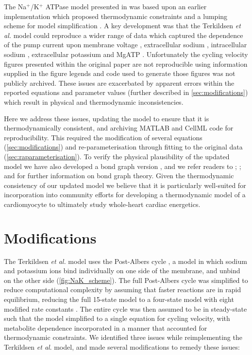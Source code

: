 \documentclass[fleqn,10pt]{physiome}
\begin{document}
The Na$^+$/K$^+$ ATPase model presented in \citet{terkildsen_balance_2007} was based upon an earlier implementation which proposed thermodynamic constraints and a lumping scheme for model simplification \citep{smith_development_2004}. A key development was that the Terkildsen \textit{et al.} model could reproduce a wider range of data which captured the dependence of the pump current upon membrane voltage \citep{nakao_[na]_1989}, extracellular sodium \citep{nakao_[na]_1989}, intracellular sodium \citep{hansen_dependence_2002}, extracellular potassium \citep{nakao_[na]_1989} and MgATP \citep{friedrich_na+k+-atpase_1996}. Unfortunately the cycling velocity figures presented within the original paper are not reproducible using information supplied in the figure legends \citep[Fig. 2]{terkildsen_balance_2007} and code used to generate those figures was not publicly archived. These issues are exacerbated by apparent errors within the reported equations and parameter values (further described in \autoref{sec:modifications}) which result in physical and thermodynamic inconsistencies.

Here we address these issues, updating the model to ensure that it is thermodynamically consistent, and archiving MATLAB and CellML \citep{lloyd_cellml:_2004} code for reproducibility. This required the modification of several equations (\autoref{sec:modifications}) and re-parameterisation through fitting to the original data (\autoref{sec:raparameterisation}). To verify the physical plausibility of the updated model we have also developed a bond graph version \citep{oster_network_1971,gawthrop_energy-based_2014}, and we refer readers to \citet{gawthrop_metamodelling:_1996}; \citet{borutzky_bond_2010}; and \citet{gawthrop_bond-graph_2007} for further information on bond graph theory. Given the thermodynamic consistency of our updated model we believe that it is particularly well-suited for incorporation into community efforts for developing a thermodynamic model of a cardiomyocyte to ultimately study whole-heart cardiac energetics. 


\section{Modifications}
\label{sec:modifications}
The Terkildsen \textit{et al.} model uses the Post-Albers cycle \citep{apell_electrogenic_1989}, a model in which sodium and potassium ions bind individually on one side of the membrane, and unbind on the other side (\autoref{fig:NaK_scheme}). The full Post-Albers cycle was simplified to reduce computational complexity by assuming that faster reactions are in rapid equilibrium, reducing the full 15-state model to a four-state model with eight modified rate constants \citep{smith_development_2004}. The entire cycle was then assumed to be in steady-state such that the model simplified to a single equation for cycling velocity, with metabolite dependence incorporated in a manner that accounted for thermodynamic constraints. We identified three issues while reimplementing the Terkildsen \textit{et al}. model, and made several modifications to remedy these issues:
\end{document}
